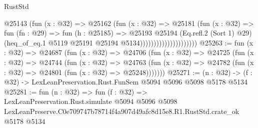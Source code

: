 \begin{lexlean}{RustStd}
\begin{coremodule}
                                    @25143
                                      (fun (x : @32) =>
                                      @25162
                                        (fun (x : @32) =>
                                        @25181
                                          (fun (x : @32) =>
                                          fun (fn : @29) =>
                                          fun (h : @25185) =>
                                          @25193
                                            @25194
                                            (Eq.refl.{2} (Sort 1) @29)
                                            (heq_of_eq.{1}
                                              @5119
                                              @25191
                                              @25194
                                              @5134)))))))))))))))))))))
@25263 := fun (x : @32) =>
  @24687
    (fun (x : @32) =>
    @24706
      (fun (x : @32) =>
      @24725
        (fun (x : @32) =>
        @24744
          (fun (x : @32) =>
          @24763 (fun (x : @32) => @24782 (fun (x : @32) => @24801 (fun (x : @32) => @25248)))))))
@25271 := (n : @32) -> (f : @32) -> LexLeanPreservation.Rust.FunSem @5094 @5096 @5098 @5178 @5134
@25281 := fun (n : @32) =>
  fun (f : @32) =>
  LexLeanPreservation.Rust.simulate
    @5094
    @5096
    @5098
    LexLeanPreserve.C0e709747b78714f4a907d49afc8d15e8.R1.RustStd.crate_ok
    @5178
    @5134
\end{coremodule}
\end{lexlean}
